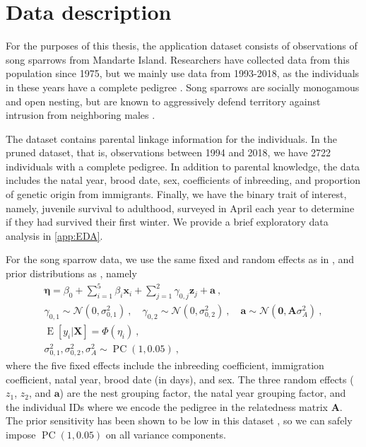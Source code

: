 \section{Data description}
For the purposes of this thesis, the application dataset consists of observations of song sparrows from Mandarte Island. Researchers have collected data from this population since 1975, but we mainly use data from 1993-2018, as the individuals in these years have a complete pedigree \autocite{reid2021}. Song sparrows are socially monogamous and open nesting, but are known to aggressively defend territory against intrusion from neighboring males \autocite{reid2021, OLoghlen1999}.

The dataset contains parental linkage information for the individuals. In the pruned dataset, that is, observations between 1994 and 2018, we have 2722 individuals with a complete pedigree. In addition to parental knowledge, the data includes the natal year, brood date, sex, coefficients of inbreeding, and proportion of genetic origin from immigrants. Finally, we have the binary trait of interest, namely, juvenile survival to adulthood, surveyed in April each year to determine if they had survived their first winter. We provide a brief exploratory data analysis in \autoref{app:EDA}.

For the song sparrow data, we use the same fixed and random effects as in \textcite{reid2021}, and prior distributions as \textcite{rekkebo2021}, namely
\begin{align}
\label{eq:method:inla model}
\bm\eta = \beta_0 + \sum_{i=1}^5 \beta_i \bm x_{i} + \sum_{j=1}^2 \gamma_{0,j} \bm z_{j} + \bm a \ , \\
\gamma_{0,1} \sim \mathcal N(0,\sigma^2_{0,1}) \ , \quad \gamma_{0,2} \sim \mathcal N(0, \sigma^2_{0,2}) \ , \quad \bm a \sim \mathcal N(\bm 0, \bm A \sigma_A^2) \ , \nonumber \\
\operatorname{E}[y_i |\bm X] = \Phi(\eta_i) \ , \nonumber \\
\sigma^2_{0,1}, \sigma^2_{0,2}, \sigma_A^2 \sim \operatorname{PC}(1,0.05) \ , \nonumber
\end{align}
where the five fixed effects include the inbreeding coefficient, immigration coefficient, natal year, brood date (in days), and sex. The three random effects ($z_1$, $z_2$, and $\bm a$) are the nest grouping factor, the natal year grouping factor, and the individual IDs where we encode the pedigree in the relatedness matrix $\bm A$. The prior sensitivity has been shown to be low in this dataset \autocite{rekkebo2021}, so we can safely impose $\operatorname{PC}(1,0.05)$ on all variance components.

